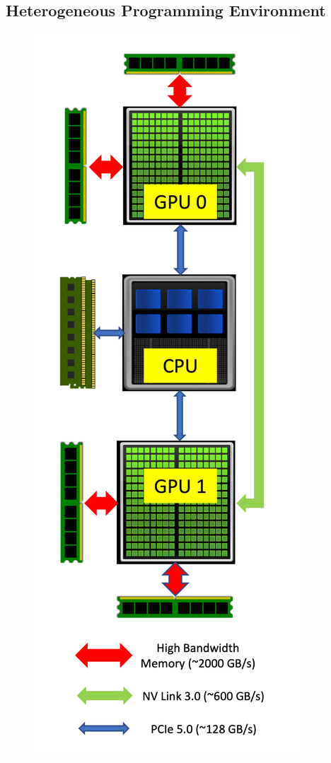\subsection{Heterogeneous Programming Environment}
\begin{figure}[ht]
    \begin{minipage}{0.28\textwidth}
        \includegraphics[width=\textwidth]{fig/cpu-gpu-architecture-HD.png}

\end{minipage}
\end{figure}
